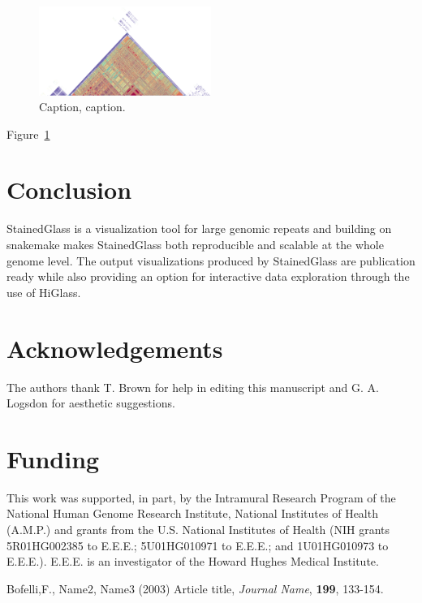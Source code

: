 \documentclass{bioinfo}
\begin{document}
%
%

\begin{figure}[!tpb]%
\centerline{\includegraphics[width=0.5\textwidth,keepaspectratio]{../images/chr8.png}}
\caption{Caption, caption.}\label{fig:01}
\end{figure}
Figure~\ref{fig:01} 


\section{Conclusion}
StainedGlass is a visualization tool for large genomic repeats and building
on snakemake makes StainedGlass both reproducible and scalable at the whole
genome level.
The output visualizations produced by StainedGlass are publication ready while also 
providing an option for interactive data exploration through the use of HiGlass.

\section*{Acknowledgements}
The authors thank T. Brown for help in editing this manuscript 
and G. A. Logsdon for aesthetic suggestions.

\section*{Funding}
This work was supported, in part,
by the Intramural Research Program of the National Human Genome Research Institute,
National Institutes of Health (A.M.P.) and grants from the U.S. National Institutes of
Health (NIH grants 5R01HG002385 to E.E.E.; 5U01HG010971 to E.E.E.; and 1U01HG010973 to
E.E.E.). E.E.E. is an investigator of the Howard Hughes Medical Institute.

%
%
%
%
%
%
%
%
%


\begin{thebibliography}{}

Bofelli,F., Name2, Name3 (2003) Article title, {\it Journal Name}, {\bf 199}, 133-154.


\end{thebibliography}
\end{document}
